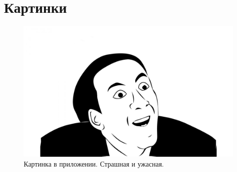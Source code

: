 \chapter{Картинки}
\label{cha:appendix1}

\begin{figure}
\centering
\includegraphics[width=\textwidth]{assets/cage.jpg}
\caption{Картинка в приложении. Страшная и ужасная.}
\end{figure}

